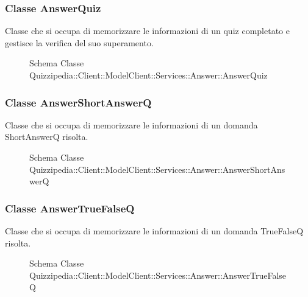 \subsubsection{Classe AnswerQuiz}
Classe che si occupa di memorizzare le informazioni di un quiz completato e gestisce la verifica del suo superamento.
\begin{figure}[H]
\centering
\noindent{}
\caption[Schema Classe AnswerQuiz]{Schema Classe Quizzipedia::Client::ModelClient::Services::Answer::AnswerQuiz}
\end{figure}
\subsubsection{Classe AnswerShortAnswerQ}
Classe che si occupa di memorizzare le informazioni di un domanda ShortAnswerQ risolta.
\begin{figure}[H]
\centering
\noindent{}
\caption[Schema Classe AnswerShortAnswerQ]{Schema Classe Quizzipedia::Client::ModelClient::Services::Answer::AnswerShortAnswerQ}
\end{figure}
\subsubsection{Classe AnswerTrueFalseQ}
Classe che si occupa di memorizzare le informazioni di un domanda TrueFalseQ risolta.
\begin{figure}[H]
\centering
\noindent{}
\caption[Schema Classe AnswerTrueFalseQ]{Schema Classe Quizzipedia::Client::ModelClient::Services::Answer::AnswerTrueFalseQ}
\end{figure}
